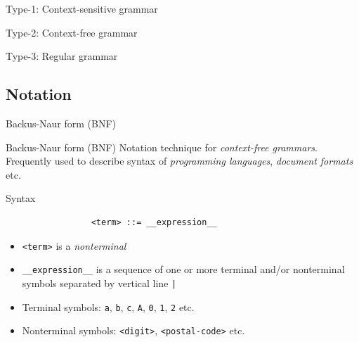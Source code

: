 \documentclass{beamer}
\begin{document}
\begin{frame}{Type-1: Context-sensitive grammar}
\end{frame}

\begin{frame}{Type-2: Context-free grammar}
\end{frame}

\begin{frame}{Type-3: Regular grammar}
\end{frame}

\subsection{Notation}

\begin{frame}[fragile]{Backus-Naur form (BNF)}

\begin{block}{Backus-Naur form (BNF)}
Notation technique for \textit{context-free grammars}. Frequently used to describe syntax of \textit{programming languages}, \textit{document formats} etc.
\end{block}


\begin{block}{Syntax}
\begin{verbatim}
                 <term> ::= __expression__
\end{verbatim}
\vskip -0.5cm
\begin{itemize}
\item \verb|<term>| is a \textit{nonterminal}
\item \verb|__expression__| is a sequence of one or more terminal and/or nonterminal symbols separated by vertical line \verb$|$
\item Terminal symbols: \verb|a|, \verb|b|, \verb|c|, \verb|A|, \verb|0|, \verb|1|, \verb|2| etc.
\item Nonterminal symbols: \verb|<digit>|, \verb|<postal-code>| etc.
\end{itemize}
\end{block}

\end{frame}
\end{document}
